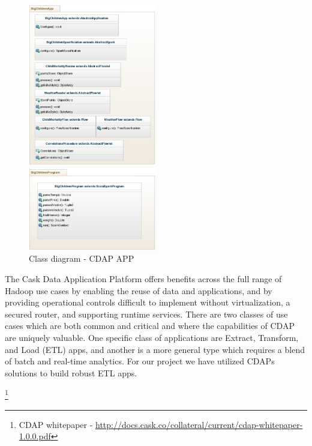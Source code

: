 \documentclass[
10pt, %
a4paper, %
oneside, %
headinclude,footinclude, %
useAMS,
usenatbib
]{mn2e}  %
\begin{document}
\begin{figure}
  \centering
  \includegraphics[width=0.50\textwidth]{BigChild_ClassDiagram2}
  \caption{Class diagram - CDAP APP}
  \label{fig:classdiagram}
\end{figure}

The Cask Data Application Platform offers benefits across the full range of Hadoop use cases by enabling the reuse of data and applications, and by providing operational controls difficult to implement without virtualization, a secured router, and supporting runtime services. There are two classes of use cases which are both common and critical and where the capabilities of CDAP are uniquely valuable. One specific class of applications are Extract, Transform, and Load (ETL) apps, and another is a more general type which requires a blend of batch and real-time analytics. For our project we have utilized CDAPs solutions to build robust ETL apps.

\footnote{CDAP whitepaper - \url{http://docs.cask.co/collateral/current/cdap-whitepaper-1.0.0.pdf}}
\end{document}
